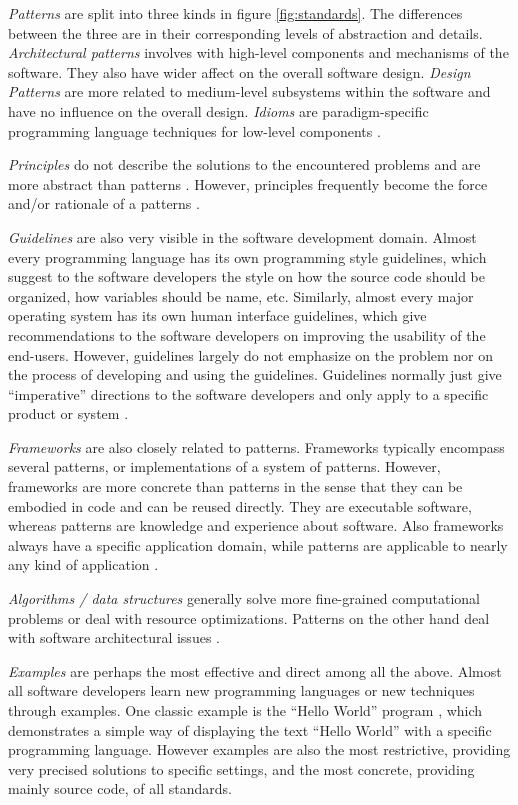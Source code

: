 \documentclass[a4paper,titlepage]{article}
\begin{document}
\textit{Patterns} are split into three kinds in figure
\ref{fig:standards}. The differences between the three are in their
corresponding levels of abstraction and details. \textit{Architectural
  patterns} involves with high-level components and mechanisms of the
software. They also have wider affect on the overall software
design. \textit{Design Patterns} are more related to medium-level
subsystems within the software and have no influence on the overall
design. \textit{Idioms} are paradigm-specific programming language
techniques for low-level components \citep{patterns:buschmann}.

\textit{Principles} do not describe the solutions to the encountered
problems and are more abstract than patterns
\citep{patterns:coplien}. However, principles frequently become the
force and/or rationale of a patterns \citep{patterns:appleton}.

\textit{Guidelines} are also very visible in the software development
domain. Almost every programming language has its own programming
style guidelines, which suggest to the software developers the style
on how the source code should be organized, how variables should be
name, etc. Similarly, almost every major operating system has its own
human interface guidelines, which give recommendations to the software
developers on improving the usability of the end-users. However,
guidelines largely do not emphasize on the problem nor on the process
of developing and using the guidelines. Guidelines normally just give
``imperative'' directions to the software developers and only apply to
a specific product or system \citep{patterns:griffiths}.

\textit{Frameworks} are also closely related to patterns. Frameworks
typically encompass several patterns, or implementations of a system
of patterns. However, frameworks are more concrete than patterns in
the sense that they can be embodied in code and can be reused
directly. They are executable software, whereas patterns are knowledge
and experience about software. Also frameworks always have a specific
application domain, while patterns are applicable to nearly any kind
of application \citep{patterns:gamma}.

\textit{Algorithms / data structures} generally solve more
fine-grained computational problems or deal with resource
optimizations. Patterns on the other hand deal with software
architectural issues \citep{patterns:appleton}.

\textit{Examples} are perhaps the most effective and direct among all
the above. Almost all software developers learn new programming
languages or new techniques through examples. One classic example is
the ``Hello World'' program \citep{c:kernighan}, which demonstrates a
simple way of displaying the text ``Hello World'' with a specific
programming language. However examples are also the most restrictive,
providing very precised solutions to specific settings, and the most
concrete, providing mainly source code, of all standards.
\end{document}
